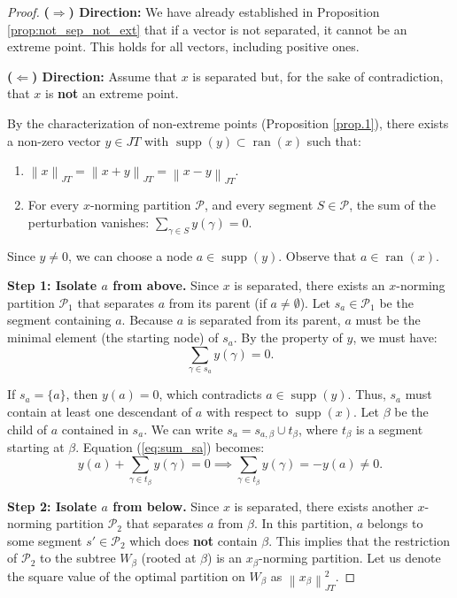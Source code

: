 \documentclass[11pt,a4paper]{amsart}
\newcommand{\JT}{JT}
\newcommand{\norm}[1]{\left\lVert#1\right\rVert}
\newcommand{\supp}{\operatorname{supp}}
\newcommand{\ran}{\operatorname{ran}}
\begin{document}
\begin{proof}
    \textbf{($\Rightarrow$) Direction:}
    We have already established in Proposition \ref{prop:not_sep_not_ext} that if a vector is not separated, it cannot be an extreme point. This holds for all vectors, including positive ones.
    
    \textbf{($\Leftarrow$) Direction:}
    Assume that $x$ is separated but, for the sake of contradiction, that $x$ is \textbf{not} an extreme point.
    
    By the characterization of non-extreme points (Proposition \ref{prop.1}), there exists a non-zero vector $y \in \JT$
    with $\supp(y) \subset \ran(x)$ such that:
    \begin{enumerate}
        \item $\norm{x}_{\JT} = \norm{x+y}_{\JT} = \norm{x-y}_{\JT}$.
        \item For every $x$-norming partition $\mathcal{P}$, and every segment $S \in \mathcal{P}$, the sum of the perturbation vanishes: $\sum_{\gamma \in S} y(\gamma) = 0$.
    \end{enumerate}
    
    Since $y \neq 0$, we can choose a node $a \in \supp(y)$. Observe that $a \in \ran(x)$.
    
    \textbf{Step 1: Isolate $a$ from above.}
    Since $x$ is separated, there exists an $x$-norming partition $\mathcal{P}_1$ that separates $a$ from its parent (if $a \neq \emptyset$). Let $s_a \in \mathcal{P}_1$ be the segment containing $a$. Because $a$ is separated from its parent, $a$ must be the minimal element (the starting node) of $s_a$.
    By the property of $y$, we must have:
    \begin{equation}\label{eq:sum_sa}
        \sum_{\gamma \in s_a} y(\gamma) = 0.
    \end{equation}
    
    If $s_a = \{a\}$, then $y(a) = 0$, which contradicts $a \in \supp(y)$. Thus, $s_a$ must contain at least one descendant of $a$ with respect to $\supp(x)$. Let $\beta$ be the child of $a$ contained in $s_a$. We can write $s_a = s_{a, \beta} \cup t_\beta$, where $t_\beta$ is a segment starting at $\beta$.
    Equation (\ref{eq:sum_sa}) becomes:
    \[ y(a) + \sum_{\gamma \in t_\beta} y(\gamma) = 0 \implies \sum_{\gamma \in t_\beta} y(\gamma) = -y(a) \neq 0. \]
    
        
    \textbf{Step 2: Isolate $a$ from below.}
    Since $x$ is separated, there exists another $x$-norming partition $\mathcal{P}_2$ that separates $a$ from $\beta$.
    In this partition, $a$ belongs to some segment $s' \in \mathcal{P}_2$ which does \textbf{not} contain $\beta$.
    This implies that the restriction of $\mathcal{P}_2$ to the subtree $W_\beta$ (rooted at $\beta$) is an $x_\beta$-norming partition. Let us denote the square value of the optimal partition on $W_\beta$ as $\norm{x_\beta}_{\JT}^2$.
    

\end{proof}
\end{document}
